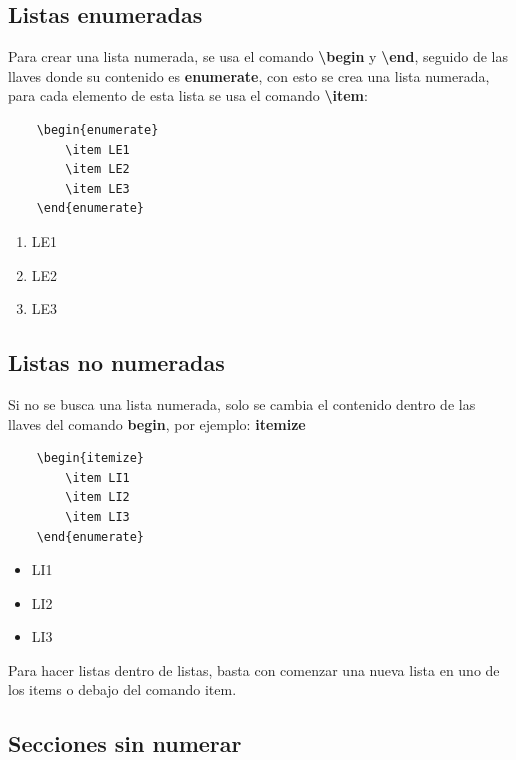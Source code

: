 \subsection{Listas enumeradas}

Para crear una lista numerada, se usa el comando \textbf{\textbackslash{begin}} y \textbf{\textbackslash{end}}, seguido de las llaves donde su contenido es \textbf{enumerate}, con esto se crea una lista numerada, para cada elemento de esta lista se usa el comando \textbf{\textbackslash{item}}:
\begin{lstlisting}
    \begin{enumerate}
        \item LE1
        \item LE2
        \item LE3
    \end{enumerate}
\end{lstlisting}
\begin{enumerate}
    \item LE1
    \item LE2
    \item LE3
\end{enumerate}


\subsection{Listas no numeradas}

Si no se busca una lista numerada, solo se cambia el contenido dentro de las llaves del comando \textbf{begin}, por ejemplo: \textbf{itemize}
\begin{lstlisting}
    \begin{itemize}
        \item LI1
        \item LI2
        \item LI3
    \end{enumerate}
\end{lstlisting}
\begin{itemize}
    \item LI1
    \item LI2
    \item LI3
\end{itemize}

Para hacer listas dentro de listas, basta con comenzar una nueva lista en uno de los items o debajo del comando item.


\subsection{Secciones sin numerar}

